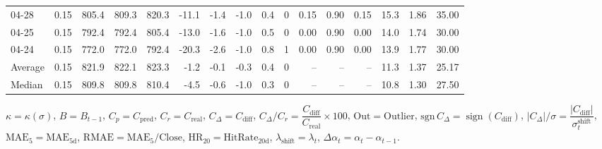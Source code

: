 \begin{threeparttable}
{\begin{tabular}{lrrrrrrrrrrrrrrr}
  04-28 &     0.15 & 805.4 & 809.3 & 820.3 &      -11.1 &           -1.4 &                     -1.0 &                 0.4 &              0 &       0.15 &      0.90 &           0.15 &             15.3 &            1.86 &                  35.00 \\
  04-25 &     0.15 & 792.4 & 792.4 & 805.4 &      -13.0 &           -1.6 &                     -1.0 &                 0.5 &              0 &       0.00 &      0.90 &           0.00 &             14.0 &            1.74 &                  30.00 \\
  04-24 &     0.15 & 772.0 & 772.0 & 792.4 &      -20.3 &           -2.6 &                     -1.0 &                 0.8 &              1 &       0.00 &      0.90 &           0.00 &             13.9 &            1.77 &                  30.00 \\
Average &     0.15 & 821.9 & 822.1 & 823.3 &       -1.2 &           -0.1 &                     -0.3 &                 0.4 &              0 &         -- &        -- &             -- &             11.3 &            1.37 &                  25.17 \\
 Median &     0.15 & 809.8 & 809.8 & 810.4 &       -4.5 &           -0.6 &                     -1.0 &                 0.3 &              0 &         -- &        -- &             -- &             10.8 &            1.30 &                  27.50 \\
\bottomrule
\end{tabular}
}
\begin{tablenotes}\footnotesize
\item $\kappa=\kappa(\sigma)$, $B=B_{t-1}$, $C_p=C_{\text{pred}}$, $C_r=C_{\text{real}}$, $C_\Delta=C_{\text{diff}}$, $C_\Delta/C_r=\dfrac{C_{\text{diff}}}{C_{\text{real}}}\times100$, $\mathrm{Out}=\text{Outlier}$, $\mathrm{sgn}\,C_\Delta=\operatorname{sign}(C_{\text{diff}})$, $|C_\Delta|/\sigma=\dfrac{|C_{\text{diff}}|}{\sigma_t^{\text{shift}}}$, $\mathrm{MAE}_5=\mathrm{MAE}_{5\text{d}}$, $\mathrm{RMAE}= \mathrm{MAE}_5 / \text{Close}$, $\mathrm{HR}_{20}=\mathrm{HitRate}_{20\text{d}}$, 
$\lambda_{\text{shift}}=\lambda_t$, 
$\Delta\alpha_t=\alpha_t-\alpha_{t-1}$.
\end{tablenotes}
\end{threeparttable}
\endgroup


